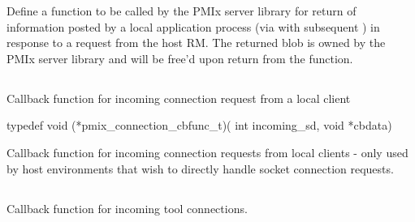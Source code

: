 \begin{arglist}
\end{arglist}


\descr
Define a function to be called by the PMIx server library for return of information posted by a local application process (via  with subsequent ) in response to a request from the host RM. The returned  blob is owned by the PMIx server library and will be free’d upon return from the function.

\subsection{}

\summary

Callback function for incoming connection request from a local client

\format

\cspecificstart
\begin{codepar}
typedef void (*pmix_connection_cbfunc_t)(
                             int incoming_sd, void *cbdata)
\end{codepar}
\cspecificend

\begin{arglist}
\end{arglist}

\descr

Callback function for incoming connection requests from local clients - only used by host environments that wish to directly handle socket connection requests.


\subsection{}

\summary

Callback function for incoming tool connections.

